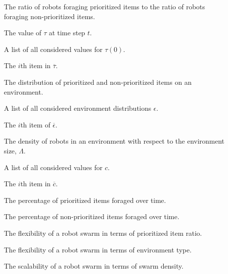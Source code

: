 \begin{description}
	\item[\parbox{\namewidth}{$\tau$}] The ratio of robots foraging prioritized items to the ratio of robots foraging non-prioritized items.

	\item[\parbox{\namewidth}{$\tau(t)$}] The value of $\tau$ at time step $t$.

	\item[\parbox{\namewidth}{$\overline{\tau}$}] A list of all considered values for $\tau(0)$.

	\item[\parbox{\namewidth}{$\tau_i(0)$}] The $i$th item in $\overline{\tau}$.
	
	\item[\parbox{\namewidth}{$\epsilon$}] The distribution of prioritized and non-prioritized items on an environment.

	\item[\parbox{\namewidth}{$\overline{\epsilon}$}] A list of all considered environment distributions $\epsilon$.

	\item[\parbox{\namewidth}{$\epsilon_i$}] The $i$th item of $\overline{\epsilon}$.

	\item[\parbox{\namewidth}{$c$}] The density of robots in an environment with respect to the environment size, $\Lambda$.

	\item[\parbox{\namewidth}{$\overline{c}$}] A list of all considered values for $c$.
	
	\item[\parbox{\namewidth}{$c_i$}] The $i$th item in $\overline{c}$.

	\item[\parbox{\namewidth}{$E_P$}] The percentage of prioritized items foraged over time.

	\item[\parbox{\namewidth}{$E_{NP}$}] The percentage of non-prioritized items foraged over time.

	\item[\parbox{\namewidth}{$F_r$}] The flexibility of a robot swarm in terms of prioritized item ratio.
	
	\item[\parbox{\namewidth}{$F_\epsilon$}] The flexibility of a robot swarm in terms of environment type.

	\item[\parbox{\namewidth}{$S_c$}] The scalability of a robot swarm in terms of swarm density.	
	

\end{description}
